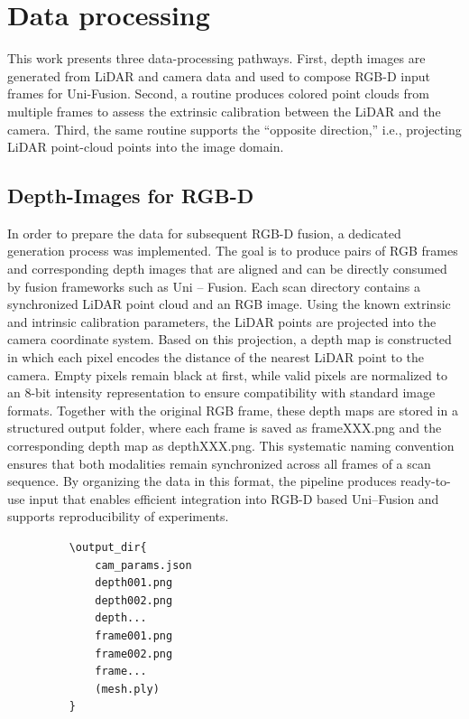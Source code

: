 \documentclass[english, bachelor, utf8]{base/thesis_telematics}
\begin{document}
\section*{Data processing}
This work presents three data-processing pathways. First, depth images are generated from
LiDAR and camera data and used to compose RGB-D input frames for Uni-Fusion. Second, a
routine produces colored point clouds from multiple frames to assess the extrinsic
calibration between the LiDAR and the camera. Third, the same routine supports the
``opposite direction,'' i.e., projecting LiDAR point-cloud points into the image domain.

\subsection*{Depth-Images for RGB-D}
In order to prepare the data for subsequent RGB-D fusion, a dedicated generation process was 
implemented. The goal is to produce pairs of RGB frames and corresponding depth images that are 
aligned and can be directly consumed by fusion frameworks such as Uni -- Fusion. Each scan 
directory contains a synchronized LiDAR point cloud and an RGB image. Using the known extrinsic 
and intrinsic calibration parameters, the LiDAR points are projected into the camera coordinate 
system. Based on this projection, a depth map is constructed in which each pixel encodes the 
distance of the nearest LiDAR point to the camera. Empty pixels remain black at first, while valid pixels 
are normalized to an 8-bit intensity representation to ensure compatibility with standard image 
formats.
Together with the original RGB frame, these depth maps are stored in a structured output 
folder, where each frame is saved as frameXXX.png and the corresponding depth map as 
depthXXX.png. This systematic naming convention ensures that both modalities remain 
synchronized across all frames of a scan sequence. By organizing the data in this format, the 
pipeline produces ready-to-use input that enables efficient integration into RGB-D based Uni--Fusion
and supports reproducibility of experiments.

\begin{figure}[ht!]
    \begin{verbatim}
    \output_dir{
        cam_params.json 
        depth001.png
        depth002.png
        depth...
        frame001.png
        frame002.png
        frame...
        (mesh.ply)
    }
\end{verbatim}
\end{figure}
\end{document}
